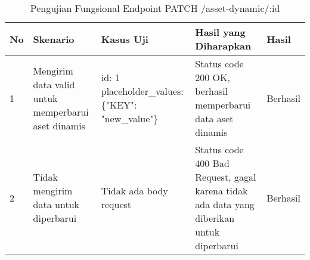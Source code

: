 \begin{table}[H]
    \centering
    \begin{tabular}{|p{0.5cm}|p{3cm}|p{5cm}|p{5cm}|p{1.5cm}|}
        \hline
        \rowcolor[HTML]{DAE8FC} 
        \textbf{No} & \textbf{Skenario} & \textbf{Kasus Uji} & \textbf{Hasil yang Diharapkan} & \textbf{Hasil} \\ \hline
        1 & Mengirim data valid untuk memperbarui aset dinamis & 
        id: 1 \newline placeholder\_values: \{"KEY": "new\_value"\} & 
        Status code 200 OK, berhasil memperbarui data aset dinamis & 
        Berhasil \\ \hline
        2 & Tidak mengirim data untuk diperbarui & 
        Tidak ada body request & 
        Status code 400 Bad Request, gagal karena tidak ada data yang diberikan untuk diperbarui & 
        Berhasil \\ \hline
    \end{tabular}
    \caption{Pengujian Fungsional Endpoint PATCH /asset-dynamic/:id}
    \label{tab:asset_dynamic_patch_testing}
\end{table}
